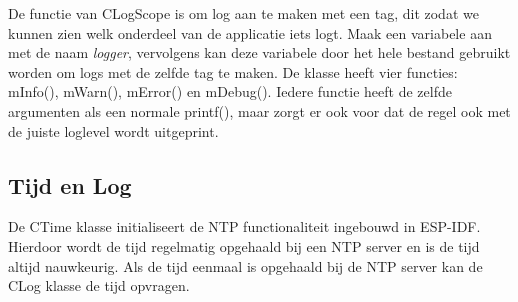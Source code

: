 \vspace{1em}
De functie van CLogScope is om log aan te maken met een tag, dit zodat we kunnen zien welk onderdeel van de applicatie iets logt. Maak een variabele aan met de naam \emph{logger}, vervolgens kan deze variabele door het hele bestand gebruikt worden om logs met de zelfde tag te maken. De klasse heeft vier functies: mInfo(), mWarn(), mError() en mDebug(). Iedere functie heeft de zelfde argumenten als een normale printf(), maar zorgt er ook voor dat de regel ook met de juiste loglevel wordt uitgeprint.

\subsection{Tijd en Log}

De CTime klasse initialiseert de NTP functionaliteit ingebouwd in ESP-IDF. Hierdoor wordt de tijd regelmatig opgehaald bij een NTP server en is de tijd altijd nauwkeurig. Als de tijd eenmaal is opgehaald bij de NTP server kan de CLog klasse de tijd opvragen.
